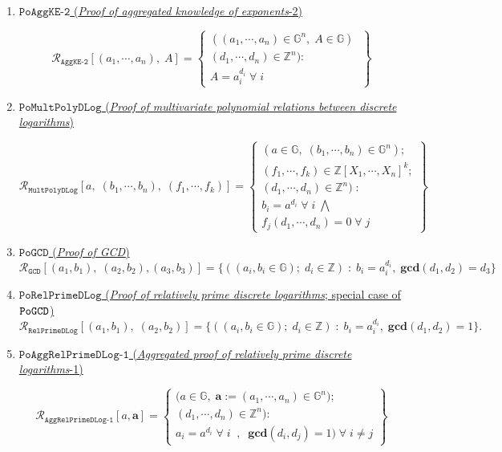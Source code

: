 \documentclass[11pt, lettersize, notitlepage, leqno, footskip=0.6cm]{article}
\newcommand{\bz}{\mathbb Z}
\newcommand{\ttt}{\texttt}
\newcommand{\mc}{\mathcal}
\newcommand{\mb}{\mathbb}
\newcommand{\mbf}{\mathbf}
\newcommand{\vs}{\vspace{-0.15cm}}
\newcommand{\GCD}{\mbf{gcd}}
\numberwithin{equation}{section}
\begin{document}
{{{\begin{enumerate}[wide, labelwidth=!, labelindent=0pt]
\item \hyperlink{AggKE-2}{$\ttt{PoAggKE-2}$ (\textit{Proof of aggregated knowledge of exponents}-2)} \vspace{-0.3cm}

\[
  \mc{R}_{{\ttt{AggKE-2}}}[(a_1,\cdots, a_n),\;A] = \left\{\begin{array}{l}
    ((a_1,\cdots, a_n)\in \mb{G}^n,\; A\in\mb{G})\;\\ 
    (d_1,\cdots,d_n)\in\bz^n) :  \\
     A = a_i^{d_i}\;\forall\;  i
  \end{array}\right\}
\]

\item \hyperlink{Mult}{$\ttt{PoMultPolyDLog}$ (\textit{Proof of multivariate polynomial relations between discrete logarithms})}\vspace{-0.6cm}

\[
  \mc{R}_{\ttt{MultPolyDLog}}[a,\; (b_1,\cdots, b_n),\; (f_1,\cdots,f_k)] = \left\{\begin{array}{l}
    (a\in\mb{G},\; (b_1,\cdots, b_n)\in\mb{G}^n);\\
    (f_1,\cdots,f_k)\in\bz[X_1,\cdots,X_n]^k;\\ 
    (d_1,\cdots,d_n)\in\bz^n)\;: \\
    b_i = a^{d_i}\;\forall\; i\;\bigwedge \;\\   f_j(d_1,\cdots,d_n) = 0\;\forall\; j 
  \end{array}\right\}
\]


\item \hyperlink{GCD}{$\ttt{PoGCD}$ (\textit{Proof of GCD})} \vspace{-0.15cm} $$\mc{R}_{{\ttt{GCD}}}[(a_1,b_1),\; (a_2,b_2),(a_3,b_3)] = \{((a_i, b_i\in\mb{G});\;d_i\in\bz)\;:\; b_i = a_i^{d_i},\;\GCD(d_1,d_2)=d_3  \} $$


\item \hyperlink{RP}{$\ttt{PoRelPrimeDLog}$ (\textit{Proof of relatively prime discrete logarithms}; special case of $\tt{PoGCD}$)} \vs $$ \mc{R}_{\ttt{RelPrimeDLog}}[(a_1,b_1),\;(a_2,b_2)] = \{((a_i, b_i\in\mb{G});\;d_i\in\bz)\;:\; b_i = a_i^{d_i},\;\GCD(d_1,d_2)=1 \} .$$


\item \hyperlink{RP1}{$\ttt{PoAggRelPrimeDLog-1}$ (\textit{Aggregated proof of relatively prime discrete logarithms}-1)} \vspace{-0.2cm}

\[
  \mc{R}_{\ttt{AggRelPrimeDLog-1}}[a, \mbf{a}] = \left\{\begin{array}{l}
    \big(a\in\mb{G},\;  \mbf{a}:=(a_1,\cdots, a_n)\in\mb{G}^n);\\
    (d_1,\cdots,d_n)\in\bz^n\big): \\
    a_i = a^{d_i}\;\forall\;i\;\;,\;\; \GCD(d_i, d_j) = 1)\;\forall \;i\neq j   	
  \end{array}\right\}
\] 


\end{enumerate}}}}
\end{document}

